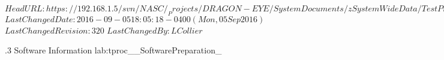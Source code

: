 \svnidlong
{$HeadURL: https://192.168.1.5/svn/NASC/_Projects/DRAGON-EYE/SystemDocuments/zSystemWideData/TestPrepProcs/TestCasePrep_SoftwareInformation.tex $}
{$LastChangedDate: 2016-09-05 18:05:18 -0400 (Mon, 05 Sep 2016) $}
{$LastChangedRevision: 320 $}
{$LastChangedBy: LCollier $}

\TestProcedure  %
{\TestProcNumber.3}
{\StdTestNameX Software Information}
{lab:tproc_\StdTestName_SoftwarePreparation_\TestProcNumber}
{
}
{
}
{
}
